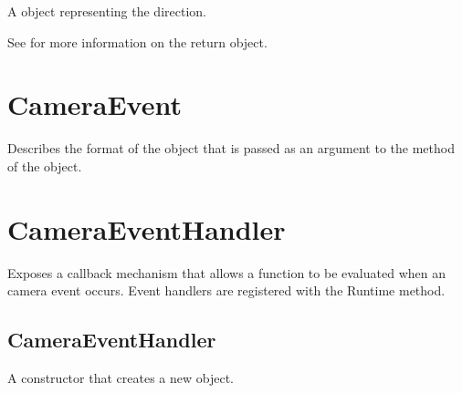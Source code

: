 \documentclass[letterpaper,12pt,english,openany,oneside]{sphinxmanual}
\begin{document}
\label{\detokenize{JS_3D_API:syntax-5}}

\begin{sphinxVerbatim}[commandchars=\\\{\}]
   
\end{sphinxVerbatim}
\label{\detokenize{JS_3D_API:parameters-3}}

\label{\detokenize{JS_3D_API:section-8}}\label{\detokenize{JS_3D_API:returns-5}}

A  object representing the direction.

See  for more information on the return object.


\section{CameraEvent}
\label{\detokenize{JS_3D_API:cameraevent}}
Describes the format of the object that is passed as an argument to the  method of the  object.

\label{\detokenize{JS_3D_API:properties-4}}


\section{CameraEventHandler}
\label{\detokenize{JS_3D_API:cameraeventhandler}}
Exposes a callback mechanism that allows a function to be evaluated when an camera event occurs. Event handlers are registered with the Runtime  method.


\subsection{CameraEventHandler}
\label{\detokenize{JS_3D_API:cameraeventhandler-1}}\label{\detokenize{JS_3D_API:id1}}
A constructor that creates a new  object.

\label{\detokenize{JS_3D_API:syntax-6}}
\end{document}

